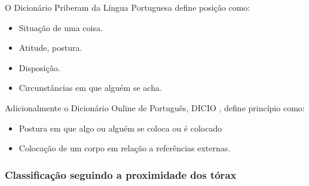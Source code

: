 
 
\begin{definition}[Posição] 
\label{def:Posicao}O Dicionário Priberam da Língua Portuguesa \cite{priberamposicao} define posição como:
\begin{itemize}
\item Situação de uma coisa.
\item Atitude, postura.
\item Disposição.
\item Circunstâncias em que alguém se acha.
\end{itemize}
Adicionalmente o Dicionário Online de Português, DICIO \cite{dicioposicao}, define princípio como:
\begin{itemize}
\item Postura em que algo ou alguém se coloca ou é colocado
\item Colocação de um corpo em relação a referências externas.
\end{itemize}
\end{definition}


\subsubsection{Classificação seguindo a proximidade dos tórax}

